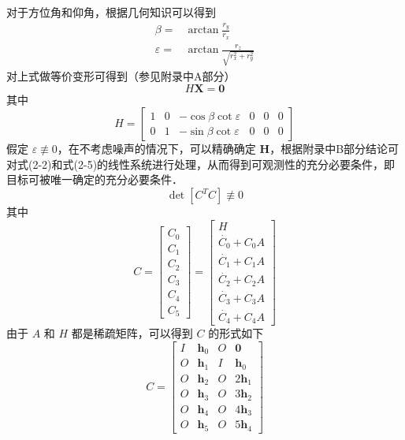 对于方位角和仰角，根据几何知识可以得到
\begin{equation}
	\begin{split}
		\beta =& \arctan \frac{r_y}{r_x} \\
		\varepsilon =& \arctan \frac{r_z}{\sqrt{r_x^2 + r_y^2}}
	\end{split}
\end{equation}
对上式做等价变形可得到（参见附录中A部分）
\begin{equation}
	H\bm{X}=\bm{0} 
\end{equation}
其中
\begin{equation*}
	H = \left[\begin{array}{cccccc}
		1 & 0 & -\cos\beta\cot\varepsilon & 0 & 0 & 0\\
		0 & 1 & -\sin\beta\cot\varepsilon & 0 & 0 & 0
	\end{array}\right]
\end{equation*}
假定 $\varepsilon \not \equiv 0$，在不考虑噪声的情况下，可以精确确定 $\bm{H}$，根据附录中B部分结论可对式(2-2)和式(2-5)的线性系统进行处理，从而得到可观测性的充分必要条件，即目标可被唯一确定的充分必要条件．
\begin{equation}
	\det[C^TC] \not \equiv 0
\end{equation}
其中
\begin{equation}
	C = \left[\begin{array}{c}
		C_0 \\ \hline
		C_1 \\ \hline
		C_2 \\ \hline
		C_3 \\ \hline
		C_4 \\ \hline
		C_5 
	\end{array}\right] 
	= \left[\begin{array}{c}
		H \\ \hline
		\dot{C_0} + C_0 A \\ \hline
		\dot{C_1} + C_1 A \\ \hline
		\dot{C_2} + C_2 A \\ \hline
		\dot{C_3} + C_3 A \\ \hline
		\dot{C_4} + C_4 A 
	\end{array}\right]
\end{equation}
由于 $A$ 和 $H$ 都是稀疏矩阵，可以得到 $C$ 的形式如下
\begin{equation}
	C = \left[\begin{array}{c|c|c|c}
		I & \bm{h}_0 & O & \bm{0} \\ \hline
		O & \bm{h}_1 & I & \bm{h}_0 \\ \hline
		O & \bm{h}_2 & O & 2\bm{h}_1 \\ \hline
		O & \bm{h}_3 & O & 3\bm{h}_2 \\ \hline
		O & \bm{h}_4 & O & 4\bm{h}_3 \\ \hline
		O & \bm{h}_5 & O & 5\bm{h}_4
	\end{array}\right]
\end{equation}
